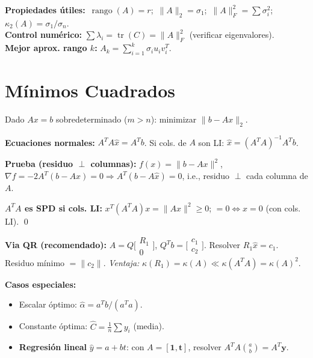 \documentclass[12pt,a4paper]{article}
\begin{document}
\begin{resultado}
\textbf{Propiedades útiles:}\ $\operatorname{rango}(A)=r$;\ $\|A\|_2=\sigma_1$;\ $\|A\|_F^2=\sum\sigma_i^2$;\ $\kappa_2(A)=\sigma_1/\sigma_n$.\\
\textbf{Control numérico:} $\sum\lambda_i=\operatorname{tr}(C)=\|A\|_F^2$ (verificar eigenvalores).\\
\textbf{Mejor aprox. rango $k$:} $A_k=\sum_{i=1}^k\sigma_iu_iv_i^T$.
\end{resultado}

\section{Mínimos Cuadrados}

Dado $Ax=b$ sobredeterminado ($m>n$): minimizar $\|b-Ax\|_2$.

\textbf{Ecuaciones normales:} $A^TA\hat x=A^Tb$. Si cols. de $A$ son LI: $\hat x=(A^TA)^{-1}A^Tb$.

\begin{resultado}
\textbf{Prueba (residuo $\perp$ columnas):} $f(x)=\|b-Ax\|^2$, $\nabla f=-2A^T(b-Ax)=0\Rightarrow A^T(b-A\hat x)=0$, i.e., residuo $\perp$ cada columna de $A$.

\textbf{$A^TA$ es SPD si cols. LI:} $x^T(A^TA)x=\|Ax\|^2\ge0$; $=0\Leftrightarrow x=0$ (con cols. LI). \qed
\end{resultado}

\textbf{Via QR (recomendado):} $A=Q\bigl[\begin{smallmatrix}R_1\\0\end{smallmatrix}\bigr]$, $Q^Tb=\bigl[\begin{smallmatrix}c_1\\c_2\end{smallmatrix}\bigr]$.
Resolver $R_1\hat x=c_1$. Residuo mínimo $=\|c_2\|$.
\textit{Ventaja:} $\kappa(R_1)=\kappa(A)\ll\kappa(A^TA)=\kappa(A)^2$.

\textbf{Casos especiales:}
\begin{itemize}[noitemsep]
  \item Escalar óptimo: $\hat\alpha=a^Tb/(a^Ta)$.
  \item Constante óptima: $\hat C=\tfrac{1}{n}\sum y_i$ (media).
  \item \textbf{Regresión lineal} $\hat y=a+bt$: con $A=[\mathbf{1},\mathbf{t}]$, resolver $A^TA\binom{a}{b}=A^T\mathbf{y}$.
\end{itemize}
\end{document}

